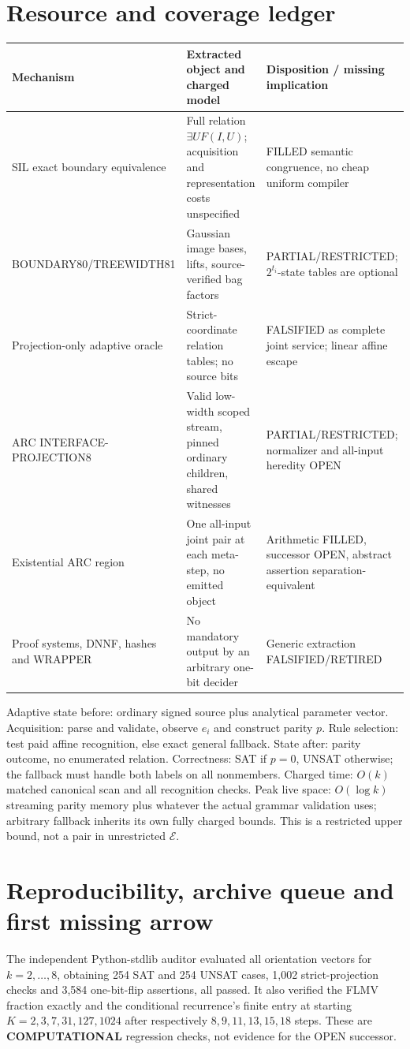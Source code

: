 \documentclass[11pt]{article}
\newcommand{\EE}{\mathcal E}
\begin{document}
\section{Resource and coverage ledger}
\begin{center}\small
\begin{tabular}{p{.24\linewidth}p{.33\linewidth}p{.31\linewidth}}\toprule
Mechanism & Extracted object and charged model & Disposition / missing implication\\\midrule
SIL exact boundary equivalence & Full relation $\exists U F(I,U)$; acquisition and representation costs unspecified & FILLED semantic congruence, no cheap uniform compiler\\
BOUNDARY80/TREEWIDTH81 & Gaussian image bases, lifts, source-verified bag factors & PARTIAL/RESTRICTED; $2^{t_i}$-state tables are optional\\
Projection-only adaptive oracle & Strict-coordinate relation tables; no source bits & FALSIFIED as complete joint service; linear affine escape\\
ARC INTERFACE-PROJECTION8 & Valid low-width scoped stream, pinned ordinary children, shared witnesses & PARTIAL/RESTRICTED; normalizer and all-input heredity OPEN\\
Existential ARC region & One all-input joint pair at each meta-step, no emitted object & Arithmetic FILLED, successor OPEN, abstract assertion separation-equivalent\\
Proof systems, DNNF, hashes and WRAPPER & No mandatory output by an arbitrary one-bit decider & Generic extraction FALSIFIED/RETIRED\\\bottomrule
\end{tabular}
\end{center}
Adaptive state before: ordinary signed source plus analytical parameter vector. Acquisition: parse and validate, observe $e_i$ and construct parity $p$. Rule selection: test paid affine recognition, else exact general fallback. State after: parity outcome, no enumerated relation. Correctness: SAT if $p=0$, UNSAT otherwise; the fallback must handle both labels on all nonmembers. Charged time: $O(k)$ matched canonical scan and all recognition checks. Peak live space: $O(\log k)$ streaming parity memory plus whatever the actual grammar validation uses; arbitrary fallback inherits its own fully charged bounds. This is a restricted upper bound, not a pair in unrestricted $\EE$.

\section{Reproducibility, archive queue and first missing arrow}
The independent Python-stdlib auditor evaluated all orientation vectors for $k=2,\ldots,8$, obtaining 254 SAT and 254 UNSAT cases, 1,002 strict-projection checks and 3,584 one-bit-flip assertions, all passed. It also verified the FLMV fraction exactly and the conditional recurrence's finite entry at starting $K=2,3,7,31,127,1024$ after respectively $8,9,11,13,15,18$ steps. These are \textbf{COMPUTATIONAL} regression checks, not evidence for the OPEN successor.
\end{document}

